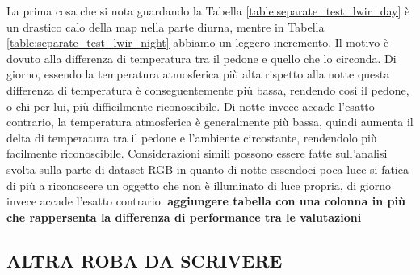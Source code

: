 \begin{table}[]
    \centering
    \caption{Risultati della valutazione separata}
    \label{table:separate_test_lwir_kaist}
\end{table}
La prima cosa che si nota guardando la Tabella \ref{table:separate_test_lwir_day} è un drastico calo della \ac{map} nella parte diurna, mentre in Tabella \ref{table:separate_test_lwir_night} abbiamo un leggero incremento. Il motivo è dovuto alla differenza di temperatura tra il pedone e quello che lo circonda. Di giorno, essendo la temperatura atmosferica più alta rispetto alla notte questa differenza di temperatura è conseguentemente più bassa, rendendo così il pedone, o chi per lui, più difficilmente riconoscibile. Di notte invece accade l'esatto contrario, la temperatura atmosferica è generalmente più bassa, quindi aumenta il delta di temperatura tra il pedone e l'ambiente circostante, rendendolo più facilmente riconoscibile. Considerazioni simili possono essere fatte sull'analisi svolta sulla parte di dataset RGB in quanto di notte essendoci poca luce si fatica di più a riconoscere un oggetto che non è illuminato di luce propria, di giorno invece accade l'esatto contrario.
\textbf{aggiungere tabella con una colonna in più che rappersenta la differenza di performance tra le valutazioni}
\subsection{ALTRA ROBA DA SCRIVERE}

